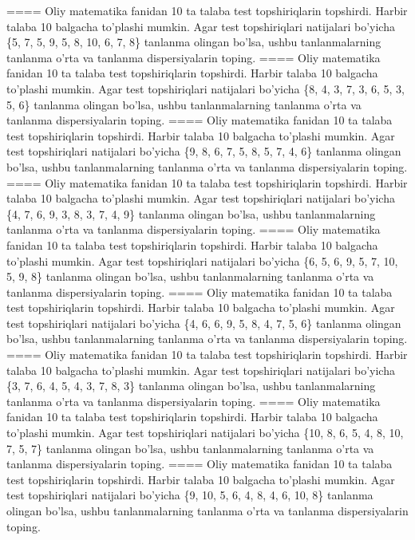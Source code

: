 ====
Oliy matematika fanidan 10 ta talaba test topshiriqlarin topshirdi. Harbir talaba 10 balgacha to'plashi mumkin. Agar test topshiriqlari natijalari bo'yicha \{5, 7, 5, 9, 5, 8, 10, 6, 7, 8\} tanlanma olingan bo'lsa, ushbu tanlanmalarning tanlanma o'rta va tanlanma dispersiyalarin toping.
====
Oliy matematika fanidan 10 ta talaba test topshiriqlarin topshirdi. Harbir talaba 10 balgacha to'plashi mumkin. Agar test topshiriqlari natijalari bo'yicha \{8, 4, 3, 7, 3, 6, 5, 3, 5, 6\} tanlanma olingan bo'lsa, ushbu tanlanmalarning tanlanma o'rta va tanlanma dispersiyalarin toping.
====
Oliy matematika fanidan 10 ta talaba test topshiriqlarin topshirdi. Harbir talaba 10 balgacha to'plashi mumkin. Agar test topshiriqlari natijalari bo'yicha \{9, 8, 6, 7, 5, 8, 5, 7, 4, 6\} tanlanma olingan bo'lsa, ushbu tanlanmalarning tanlanma o'rta va tanlanma dispersiyalarin toping.
====
Oliy matematika fanidan 10 ta talaba test topshiriqlarin topshirdi. Harbir talaba 10 balgacha to'plashi mumkin. Agar test topshiriqlari natijalari bo'yicha \{4, 7, 6, 9, 3, 8, 3, 7, 4, 9\} tanlanma olingan bo'lsa, ushbu tanlanmalarning tanlanma o'rta va tanlanma dispersiyalarin toping.
====
Oliy matematika fanidan 10 ta talaba test topshiriqlarin topshirdi. Harbir talaba 10 balgacha to'plashi mumkin. Agar test topshiriqlari natijalari bo'yicha \{6, 5, 6, 9, 5, 7, 10, 5, 9, 8\} tanlanma olingan bo'lsa, ushbu tanlanmalarning tanlanma o'rta va tanlanma dispersiyalarin toping.
====
Oliy matematika fanidan 10 ta talaba test topshiriqlarin topshirdi. Harbir talaba 10 balgacha to'plashi mumkin. Agar test topshiriqlari natijalari bo'yicha \{4, 6, 6, 9, 5, 8, 4, 7, 5, 6\} tanlanma olingan bo'lsa, ushbu tanlanmalarning tanlanma o'rta va tanlanma dispersiyalarin toping.
====
Oliy matematika fanidan 10 ta talaba test topshiriqlarin topshirdi. Harbir talaba 10 balgacha to'plashi mumkin. Agar test topshiriqlari natijalari bo'yicha \{3, 7, 6, 4, 5, 4, 3, 7, 8, 3\} tanlanma olingan bo'lsa, ushbu tanlanmalarning tanlanma o'rta va tanlanma dispersiyalarin toping.
====
Oliy matematika fanidan 10 ta talaba test topshiriqlarin topshirdi. Harbir talaba 10 balgacha to'plashi mumkin. Agar test topshiriqlari natijalari bo'yicha \{10, 8, 6, 5, 4, 8, 10, 7, 5, 7\} tanlanma olingan bo'lsa, ushbu tanlanmalarning tanlanma o'rta va tanlanma dispersiyalarin toping.
====
Oliy matematika fanidan 10 ta talaba test topshiriqlarin topshirdi. Harbir talaba 10 balgacha to'plashi mumkin. Agar test topshiriqlari natijalari bo'yicha \{9, 10, 5, 6, 4, 8, 4, 6, 10, 8\} tanlanma olingan bo'lsa, ushbu tanlanmalarning tanlanma o'rta va tanlanma dispersiyalarin toping.
